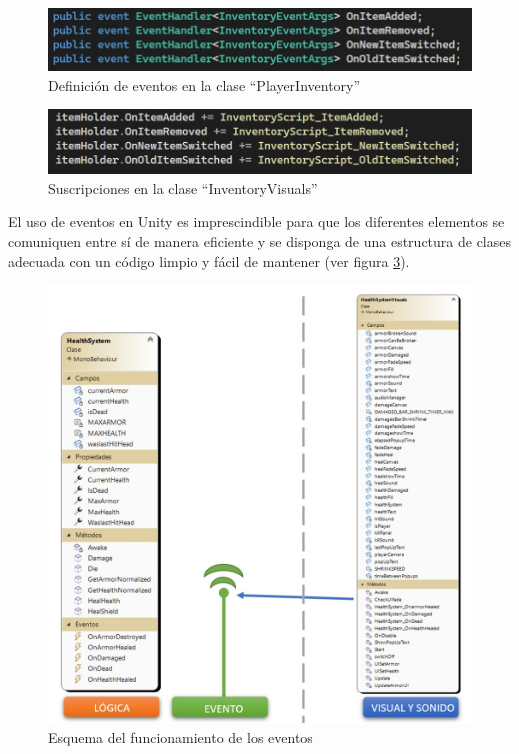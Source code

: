 \begin{figure}[h]
	\centering
	\includegraphics[scale=0.45]{img/InventoryEvents.jpg}
	\caption{Definición de eventos en la clase “PlayerInventory”}
	\label{fig:EventosInventario}
\end{figure}

\begin{figure}[h]
    \centering
    \includegraphics[scale=0.45]{img/InventorySubscribers.jpg}
    \caption{Suscripciones en la clase “InventoryVisuals”}
    \label{fig:SuscripcionesInventario}
\end{figure}
El uso de eventos en Unity es imprescindible para que los diferentes elementos se comuniquen entre sí de manera eficiente y se disponga de una estructura de clases adecuada con un código limpio y fácil de mantener (ver figura \ref{fig:EsquemaEventos}).

\begin{figure}[h]
    \centering
    \includegraphics[scale=0.45]{img/EventsUnity.jpg}
    \caption{Esquema del funcionamiento de los eventos}
    \label{fig:EsquemaEventos}
\end{figure}

